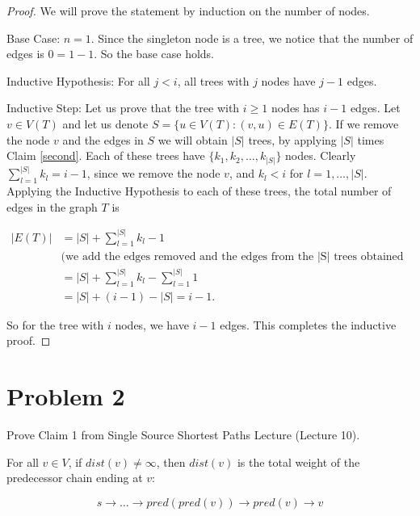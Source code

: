 \documentclass[a4paper, 11pt]{article}
\begin{document}
\begin{proof}
	We will prove the statement by induction on the number of nodes.
	
	Base Case: $n = 1$. Since the singleton node is a tree, we notice that the number of edges is $0 = 1 - 1$. So the base case holds. 

	Inductive Hypothesis: For all $j < i$, all trees with $j$ nodes have $j - 1$ edges.

	Inductive Step: Let us prove that the tree with $i \geq 1$ nodes has $i - 1$ edges. Let $v \in V(T)$ and let us denote $S = \{ u \in V(T) : (v, u) \in E(T)\}$. If we remove the node $v$ and the edges in $S$ we will obtain $|S|$ trees, by applying $|S|$ times Claim \ref{second}. Each of these trees have $\{k_1, k_2, \dots, k_{|S|}\}$ nodes. Clearly $\sum_{l = 1}^{|S|} k_l = i - 1$, since we remove the node $v$,  and $k_l < i$ for $l = 1, \dots, |S|$. Applying the Inductive Hypothesis to each of these trees, the total number of edges in the graph $T$ is 

	\begin{equation*}
		\begin{split}
			|E(T)| &=|S| + \sum_{l = 1}^{|S|} k_l - 1 \\
			&\text{(we add the edges removed and the edges from the |S| trees obtained using the I.H.)} \\
			&= |S| + \sum_{l = 1}^{|S|} k_l - \sum_{l = 1}^{|S|} 1 \\
			&= |S| + (i - 1) - |S| = i - 1.
		\end{split}
	\end{equation*}

So for the tree with $i$ nodes, we have $i - 1$ edges. This completes the inductive proof.

\end{proof}

\section*{Problem 2}

Prove Claim 1 from Single Source Shortest Paths Lecture (Lecture 10).

For all $v \in V$, if $dist(v) \neq \infty$, then $dist(v)$ is the total weight of the predecessor chain ending at $v:$

\begin{equation*}
	s \rightarrow \dots \rightarrow pred(pred(v)) \rightarrow pred(v) \rightarrow v
\end{equation*}
\end{document}
